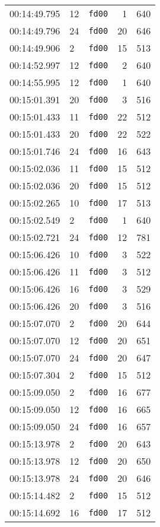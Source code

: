 \documentclass{article}
\begin{document}
\begin{longtable}{lllrr}
00:14:49.795 & 12 & \texttt{fd00} & 1 & 640 \\
00:14:49.796 & 24 & \texttt{fd00} & 20 & 646 \\
00:14:49.906 & 2 & \texttt{fd00} & 15 & 513 \\
00:14:52.997 & 12 & \texttt{fd00} & 2 & 640 \\
00:14:55.995 & 12 & \texttt{fd00} & 1 & 640 \\
00:15:01.391 & 20 & \texttt{fd00} & 3 & 516 \\
00:15:01.433 & 11 & \texttt{fd00} & 22 & 512 \\
00:15:01.433 & 20 & \texttt{fd00} & 22 & 522 \\
00:15:01.746 & 24 & \texttt{fd00} & 16 & 643 \\
00:15:02.036 & 11 & \texttt{fd00} & 15 & 512 \\
00:15:02.036 & 20 & \texttt{fd00} & 15 & 512 \\
00:15:02.265 & 10 & \texttt{fd00} & 17 & 513 \\
00:15:02.549 & 2 & \texttt{fd00} & 1 & 640 \\
00:15:02.721 & 24 & \texttt{fd00} & 12 & 781 \\
00:15:06.426 & 10 & \texttt{fd00} & 3 & 522 \\
00:15:06.426 & 11 & \texttt{fd00} & 3 & 512 \\
00:15:06.426 & 16 & \texttt{fd00} & 3 & 529 \\
00:15:06.426 & 20 & \texttt{fd00} & 3 & 516 \\
00:15:07.070 & 2 & \texttt{fd00} & 20 & 644 \\
00:15:07.070 & 12 & \texttt{fd00} & 20 & 651 \\
00:15:07.070 & 24 & \texttt{fd00} & 20 & 647 \\
00:15:07.304 & 2 & \texttt{fd00} & 15 & 512 \\
00:15:09.050 & 2 & \texttt{fd00} & 16 & 677 \\
00:15:09.050 & 12 & \texttt{fd00} & 16 & 665 \\
00:15:09.050 & 24 & \texttt{fd00} & 16 & 657 \\
00:15:13.978 & 2 & \texttt{fd00} & 20 & 643 \\
00:15:13.978 & 12 & \texttt{fd00} & 20 & 650 \\
00:15:13.978 & 24 & \texttt{fd00} & 20 & 646 \\
00:15:14.482 & 2 & \texttt{fd00} & 15 & 512 \\
00:15:14.692 & 16 & \texttt{fd00} & 17 & 512 \\

\end{longtable}
\end{document}
